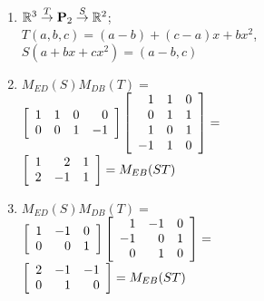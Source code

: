 \begin{multicols}{1}
\begin{ex}
\begin{enumerate}[label={\alph*.}]
\item $\mathbb{R}^3 \stackrel{T}{\to} \textbf{P}_2 \stackrel{S}{\to} \mathbb{R}^2$; \\ $T(a, b, c) = (a - b) + (c - a)x + bx^2$, \\ $S(a + bx + cx^2) = (a - b, c)$


\end{enumerate}
\begin{sol}
\begin{enumerate}[label={\alph*.}]
\setcounter{enumi}{1}
\item $M_{ED}(S)M_{DB}(T) = {}$ \\ $\left[ \begin{array}{rrrr} 1 & 1 & 0 & 0 \\ 0 & 0 & 1 & -1 \end{array} \right]\left[ \begin{array}{rrr} 1 & 1 & 0 \\ 0 & 1 & 1 \\ 1 & 0 & 1 \\ -1 & 1 & 0 \end{array} \right] = {}$ \\ $\left[ \begin{array}{rrr} 1 & 2 & 1 \\ 2 & -1 & 1 \end{array} \right] = M_{EB}(ST)$


\setcounter{enumi}{3}
\item $M_{ED}(S)M_{DB}(T) = {}$ \\ $\left[ \begin{array}{rrr} 1 & -1 & 0 \\ 0 & 0 & 1 \end{array} \right]\left[ \begin{array}{rrr} 1 & -1 & 0 \\ -1 & 0 & 1 \\ 0 & 1 & 0 \end{array} \right] = {}$ \\ $\left[ \begin{array}{rrr} 2 & -1 & -1 \\ 0 & 1 & 0 \end{array} \right] = M_{EB}(ST)$


\end{enumerate}
\end{sol}
\end{ex}


\end{multicols}
